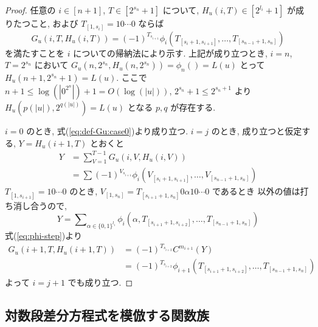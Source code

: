 \begin{proof}
 任意の $i \in [n+1]$, $T \in [2^{s_n}+1]$ について,
 $H_u(i,T) \in [2^{l_i}+1]$ が成りたつこと,
 および $T_{[1,s_i]} = 10 \cdots 0$ ならば
 \begin{equation} \label{eq:subformula}
  G_u(i,T,H_u(i,T)) = (-1)^{T_{s_{i+1}}} 
   \phi_i(T_{[s_i+1, s_{i+1}]}, \dots, T_{[s_{n-1}+1, s_n]})
 \end{equation}
 を満たすことを $i$ についての帰納法により示す.
 上記が成り立つとき,
 $i=n$, $T=2^{s_n}$ において $G_u(n, 2^{s_n}, H_u(n,2^{s_n})) = \phi_n() = L(u)$
 とって $H_u(n+1, 2^{s_n}+1) = L(u)$.
 ここで $n+1 \le \log(|0^{2^n}|) + 1 = O(\log(|u|))$,
 $2^{s_n}+1 \le 2^{s_n+1}$ より $H_u(p(|u|), 2^{q(|u|)}) = L(u)$
 となる $p,q$ が存在する.

 $i=0$ のとき, 式(\ref{eq:def-Gu:case0})より成り立つ.
 $i=j$ のとき, 成り立つと仮定する, $Y = H_u(i+1, T)$ とおくと
 \begin{align}
  Y 
  &= \sum_{V = 1}^{T-1} G_u(i, V, H_u(i, V)) \\
  &= \sum (-1)^{V_{s_{i+1}}} \phi_i(V_{[s_i+1, s_{i+1}]}, 
   \dots, V_{[s_{n-1}+1, s_n]})
 \end{align}
 $T_{[1, s_{i+1}]} = 10 \cdots 0$ のとき,
 $V_{[1, s_n]} = T_{[s_{i+1}+1,s_n]} 0 \alpha 1 0 \cdots 0$ であるとき
 以外の値は打ち消し合うので,
 \begin{equation}
  Y = \sum\nolimits_{\alpha \in \{0,1\}^{l_i}} 
  \phi_i(\alpha, T_{[s_{i+1}+1, s_{i+2}]}, \dots, T_{[s_{n-1}+1, s_n]})
 \end{equation}
 式(\ref{eq:phi-step})より
 \begin{align}
  G_u(i+1,T,H_u(i+1,T)) 
  &= (-1)^{T_{s_{i+2}}} C^{m_{i+1}} (Y)\\
  &= (-1)^{T_{s_{i+2}}} \phi_{i+1}(T_{[s_{i+1}+1, s_{i+2}]}, \dots, T_{[s_{n-1}+1, s_n]})
 \end{align}
 よって $i=j+1$ でも成り立つ.
 \end{proof}


\subsection{対数段差分方程式を模倣する関数族}

